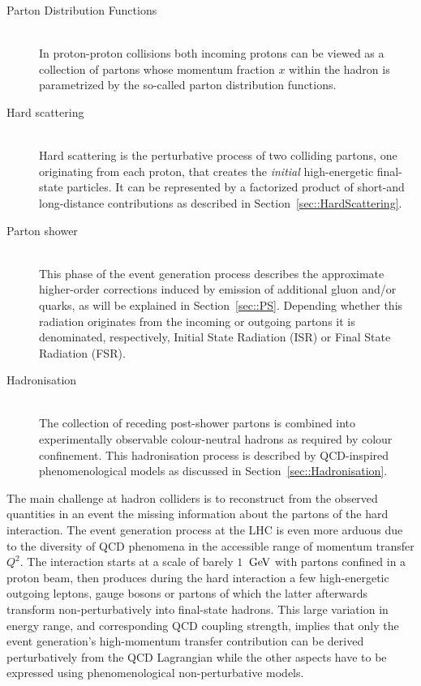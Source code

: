 \begin{myindentpar}
  \begin{description}
    \item[Parton Distribution Functions] \hfill \\
      In proton-proton collisions both incoming protons can be viewed as a collection of partons whose momentum fraction $x$ within the hadron is parametrized by the so-called parton distribution functions.
    \item[Hard scattering] \hfill \\
      Hard scattering is the perturbative process of two colliding partons, one originating from each proton, that creates the \textit{initial} high-energetic final-state particles. It can be represented by a factorized product of short-and long-distance contributions as described in Section~\ref{sec::HardScattering}.
    \item[Parton shower] \hfill \\
      This phase of the event generation process describes the approximate higher-order corrections induced by emission of additional gluon and/or quarks, as will be explained in Section~\ref{sec::PS}. Depending whether this radiation originates from the incoming or outgoing partons it is denominated, respectively, Initial State Radiation (ISR) or Final State Radiation (FSR).
    \item[Hadronisation] \hfill \\
      The collection of receding post-shower partons is combined into experimentally observable colour-neutral hadrons as required by colour confinement. This hadronisation process is described by QCD-inspired phenomenological models as discussed in Section~\ref{sec::Hadronisation}.
  \end{description}
\end{myindentpar}

The main challenge at hadron colliders is to reconstruct from the observed quantities in an event the missing information about the partons of the hard interaction. 
The event generation process at the LHC is even more arduous due to the diversity of QCD phenomena in the accessible range of momentum transfer $Q^{2}$. %
The interaction starts at a scale of barely $1$ $\, \mathrm{GeV}$ with partons confined in a proton beam, then produces during the hard interaction a few high-energetic outgoing leptons, gauge bosons or partons of which the latter afterwards transform non-perturbatively into final-state hadrons. This large variation in energy range, and corresponding QCD coupling strength, implies that only the event generation's high-momentum transfer contribution can be derived perturbatively from the QCD Lagrangian while the other aspects have to be expressed using phenomenological non-perturbative models.

